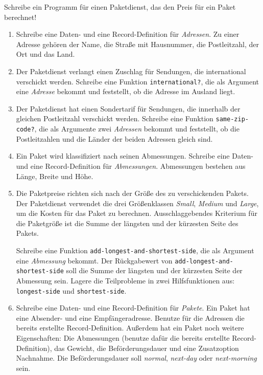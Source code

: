 \begin{aufgabe}

  Schreibe ein Programm für einen Paketdienst, das den Preis
  für ein Paket berechnet!
  \begin{enumerate}
    
  \item Schreibe eine Daten- und eine Record-Definition für
    \textit{Adressen}.  Zu einer Adresse gehören der Name, die Straße
    mit Hausnummer, die Postleitzahl, der Ort und das Land.
    
  \item Der Paketdienst verlangt einen Zuschlag für Sendungen, die
    international verschickt werden.  Schreibe eine Funktion
    \lstinline{international?}, die als Argument eine \textit{Adresse}
    bekommt und feststellt, ob die Adresse im Ausland liegt.

  \item Der Paketdienst hat einen Sondertarif für Sendungen, die
    innerhalb der gleichen Postleitzahl verschickt werden.  Schreibe
    eine Funktion \lstinline{same-zip-code?}, die als Argumente zwei
    \textit{Adressen} bekommt und feststellt, ob die Postleitzahlen
    und die Länder der beiden Adressen gleich sind.

  \item Ein Paket wird klassifiziert nach seinen Abmessungen.
    Schreibe eine Daten- und eine Record-Definition für
    \textit{Abmessungen}.  Abmessungen bestehen aus Länge, Breite und
    Höhe.

  \item Die Paketpreise richten sich nach der Größe des zu
    verschickenden Pakets.  Der Paketdienst verwendet die drei
    Größenklassen \textit{Small}, \textit{Medium} und \textit{Large},
    um die Kosten für das Paket zu berechnen.  Ausschlaggebendes
    Kriterium für die Paketgröße ist die Summe der längsten und der
    kürzesten Seite des Pakets.

    Schreibe eine Funktion
    \lstinline{add-longest-and-shortest-side}, die als Argument eine
    \textit{Abmessung} bekommt.  Der Rückgabewert von
    \lstinline{add-longest-and-shortest-side} soll die Summe der längsten
    und der kürzesten Seite der Abmessung sein.  Lagere die
    Teilprobleme in zwei Hilfsfunktionen aus: \lstinline{longest-side}
    und \lstinline{shortest-side}.

  \item Schreibe eine Daten- und eine Record-Definition für
    \textit{Pakete}.  Ein Paket hat eine Absender- und eine
    Empfängeradresse.  Benutze für die Adressen die bereits
    erstellte Record-Definition.  Außerdem hat ein Paket noch weitere
    Eigenschaften: Die Abmessungen (benutze dafür die bereits
    erstellte Record-Definition), das Gewicht, die Beförderungsdauer
    und eine Zusatz\-option Nachnahme.  Die Beförderungsdauer soll
    \emph{normal}, \emph{next-day} oder \emph{next-morning} sein.


\end{enumerate}
\end{aufgabe}
